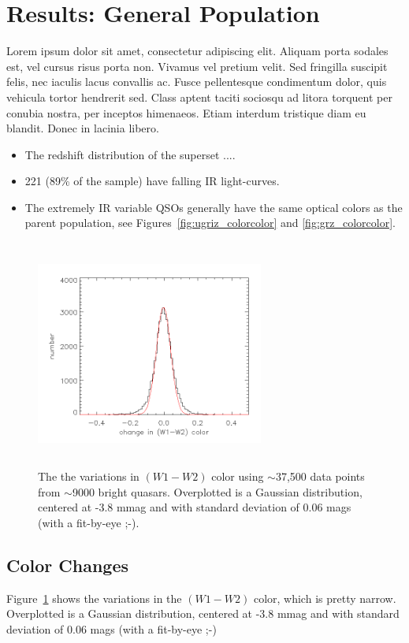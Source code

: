 \documentclass{emulateapj}
\begin{document}
\section{Results: General Population}
Lorem ipsum dolor sit amet, consectetur adipiscing elit. Aliquam porta
sodales est, vel cursus risus porta non. Vivamus vel pretium
velit. Sed fringilla suscipit felis, nec iaculis lacus convallis
ac. Fusce pellentesque condimentum dolor, quis vehicula tortor
hendrerit sed. Class aptent taciti sociosqu ad litora torquent per
conubia nostra, per inceptos himenaeos. Etiam interdum tristique diam
eu blandit. Donec in lacinia libero.

\begin{itemize}
    \item{The redshift distribution of the superset .... }
    \item{221 (89\% of the sample) have falling IR light-curves.}
    \item The extremely IR variable QSOs generally have the same optical colors as the parent population, 
    see Figures~\ref{fig:ugriz_colorcolor} and \ref{fig:grz_colorcolor}. 
\end{itemize}
 

\begin{figure}
  \includegraphics[width=7.50cm, height=7.50cm, 
  trim=0.0cm 0.0cm 0.0cm 0.0cm, clip]
  {w1w2_color_variation.png}
  \centering
  \caption[]{The the variations in $(W1-W2)$ color using
    $\sim$37,500 data points from $\sim$9000 bright quasars.
    Overplotted is a Gaussian distribution, centered at -3.8 mmag 
    and with standard deviation of 0.06 mags (with a fit-by-eye ;-).}
  \label{fig:w1w2_color_variation}
\end{figure}
\subsection{Color Changes}
Figure~\ref{fig:w1w2_color_variation} shows the variations in the
$(W1-W2)$ color, which is pretty narrow. Overplotted is a Gaussian
distribution, centered at -3.8 mmag and with standard deviation of
0.06 mags (with a fit-by-eye ;-)
\end{document}
